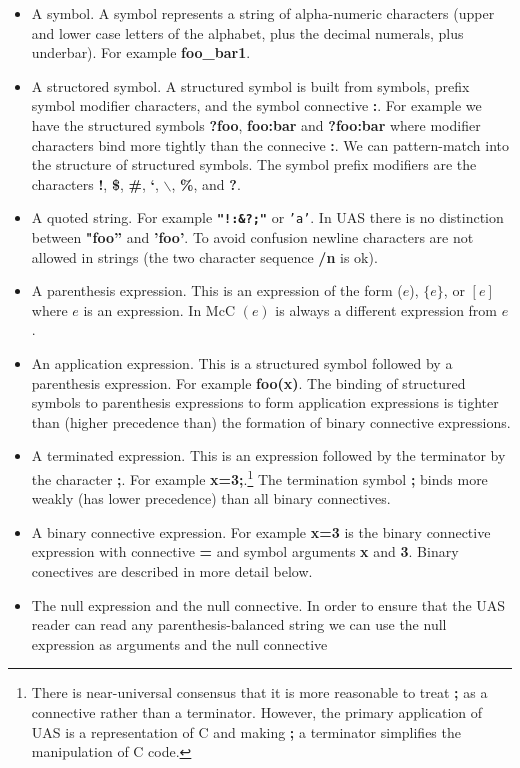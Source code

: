 \documentclass{article}
\begin{document}
\begin{itemize}
\item A symbol.  A symbol represents a string of alpha-numeric characters (upper and lower case letters of the alphabet, plus the decimal numerals, plus underbar).
  For example {\bf foo\_bar1}.
\item A structored symbol.  A structured symbol is built from symbols, prefix symbol modifier characters, and the symbol connective {\bf :}.  For example we have the structured symbols {\bf ?foo}, {\bf foo:bar}
  and {\bf ?foo:bar} where modifier characters bind more tightly than the connecive {\bf :}.  We can pattern-match into the structure of structured symbols.
  The symbol prefix modifiers are the characters {\bf !}, {\bf \$}, {\bf \#}, {\bf `}, {\bf $\backslash$}, {\bf \%}, and {\bf ?}.
\item A quoted string.  For example {\bf \tt "!:\&?;"} or {\tt 'a'}.  In UAS there is no distinction between {\bf "foo''} and {\bf 'foo'}.  To avoid confusion newline characters are not allowed in strings (the two character sequence {\bf /n} is ok).
\item A parenthesis expression.  This is an expression of the form ($e$), $\{e\}$, or $[e]$ where $e$ is an expression.  In McC $(e)$ is always a different expression from $e$.
\item An application expression.  This is a structured symbol followed by a parenthesis expression.  For example {\bf foo(x)}.
The binding of structured symbols to parenthesis expressions to form application expressions is tighter than (higher precedence than) the formation of binary connective expressions.
\item A terminated expression.  This is an expression followed by the terminator by the character {\bf ;}. For example {\bf x=3;}.\footnote{There is near-universal consensus that it is more reasonable to treat {\bf ;}
  as a connective rather than a terminator.  However, the primary application of UAS is a representation of C and making {\bf ;} a terminator simplifies the manipulation of C code.}  The termination symbol {\bf ;} binds more
  weakly (has lower precedence) than all binary connectives.
\item A binary connective expression.  For example {\bf x=3} is the binary connective expression with connective {\bf =} and symbol arguments {\bf x} and {\bf 3}.  Binary conectives are described in more detail below.
\item The null expression and the null connective. In order to ensure that the UAS reader can read any parenthesis-balanced string we can use the null expression as arguments and the null connective

\end{itemize}
\end{document}
